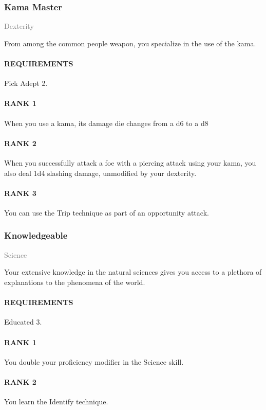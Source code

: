 \subsubsection{Kama Master} \label{feat::kamamaster}
\small{\textcolor{gray}{Dexterity}}

\normalsize
From among the common people weapon, you specialize in the use of the kama.
\paragraph{REQUIREMENTS} Pick Adept 2.
\paragraph{RANK 1} When you use a kama, its damage die changes from a d6 to a d8
\paragraph{RANK 2} When you successfully attack a foe with a piercing attack using your kama, you also deal 1d4 slashing damage, unmodified by your dexterity.
\paragraph{RANK 3} You can use the Trip technique as part of an opportunity attack.

\subsubsection{Knowledgeable} \label{feat::knowledgeable}
\small{\textcolor{gray}{Science}}

\normalsize
Your extensive knowledge in the natural sciences gives you access to a plethora of explanations to the phenomena of the world.
\paragraph{REQUIREMENTS} Educated 3.
\paragraph{RANK 1} You double your proficiency modifier in the Science skill.
\paragraph{RANK 2} You learn the Identify technique.
